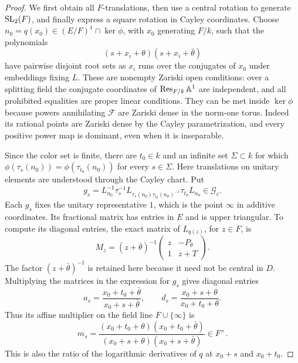 \begin{proof}
We first obtain all \(F\)-translations, then use a central rotation to
generate \(\operatorname{SL}_2(F)\), and finally express a square rotation in Cayley
coordinates.  Choose
\(n_0=q(x_0)\in(E/F)^1\cap\ker\phi\), with \(x_0\) generating
\(F/k\), such that the polynomials
\begin{equation}\label{rec:disjoint-poles}
 (s+x_i+\theta)(s+x_i+\bar\theta)
\end{equation}
have pairwise disjoint root sets as \(x_i\) runs over the conjugates
of \(x_0\) under embeddings fixing \(L\).  These are nonempty Zariski
open conditions: over a splitting field the conjugate coordinates of
\(\operatorname{Res}_{F/k}\mathbb A^1\) are independent, and all prohibited equalities
are proper linear conditions.  They can be met inside \(\ker\phi\)
because powers annihilating \(\mathcal F\) are Zariski dense in the
norm-one torus.  Indeed its rational points are Zariski dense by the
Cayley parametrization, and every positive power map is dominant, even
when it is inseparable.

Since the color set is finite, there are \(t_0\in k\) and an infinite
set \(\Sigma\subset k\) for which
\(\phi(\tau_s(n_0))=\phi(\tau_{t_0}(n_0))\) for every
\(s\in\Sigma\).  Here translations on unitary elements are understood
through the Cayley chart.  Put
\[
 g_s=L_{n_0}^{-1}\tau_s^{-1}
       L_{\tau_s(n_0)\tau_{t_0}(n_0)^{-1}}
       \tau_{t_0}L_{n_0}\in\mathcal G_c.
\]
Each \(g_s\) fixes the unitary representative \(1\), which is the
point \(\infty\) in additive coordinates.  Its fractional matrix has
entries in \(E\) and is upper triangular.  To compute its diagonal
entries, the exact matrix of \(L_{q(z)}\), for \(z\in F\), is
\[
 M_z=(z+\bar\theta)^{-1}
       \begin{pmatrix}z&-P_\theta\\1&z+T\end{pmatrix}.
\]
The factor \((z+\bar\theta)^{-1}\) is retained here because it need
not be central in \(D\).  Multiplying the matrices in the expression
for \(g_s\) gives diagonal entries
\[
 a_s=\frac{x_0+t_0+\bar\theta}{x_0+s+\bar\theta},\qquad
 d_s=\frac{x_0+s+\theta}{x_0+t_0+\theta}.
\]
Thus its affine multiplier on the field line
\(F\cup\{\infty\}\) is
\begin{equation}\label{rec:affine-multipliers}
 m_s=\frac{(x_0+t_0+\theta)(x_0+t_0+\bar\theta)}
           {(x_0+s+\theta)(x_0+s+\bar\theta)}\in F^\times.
\end{equation}
This is also the ratio of the logarithmic derivatives of \(q\) at
\(x_0+s\) and \(x_0+t_0\).


\end{proof}
